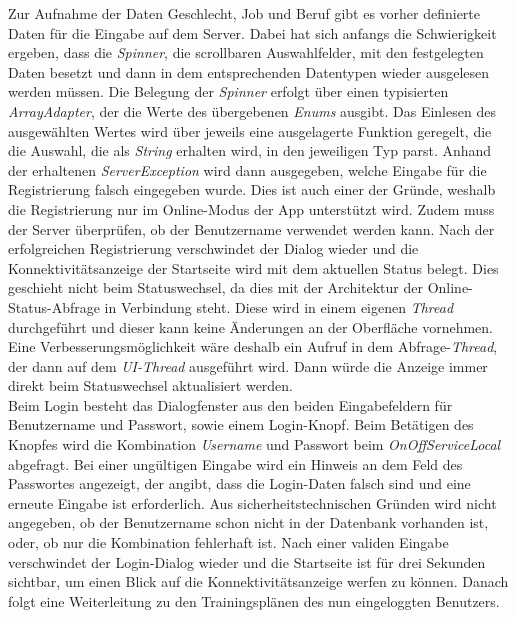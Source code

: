 Zur Aufnahme der Daten Geschlecht, Job und Beruf gibt es vorher definierte Daten für die Eingabe auf dem Server. Dabei hat sich anfangs die Schwierigkeit ergeben, dass die \textit{Spinner}, die scrollbaren Auswahlfelder, mit den festgelegten Daten besetzt und dann in dem entsprechenden Datentypen wieder ausgelesen werden müssen. Die Belegung der \textit{Spinner} erfolgt über einen typisierten \textit{ArrayAdapter}, der die Werte des übergebenen \textit{Enums} ausgibt. Das Einlesen des ausgewählten Wertes wird über jeweils eine ausgelagerte Funktion geregelt, die die Auswahl, die als \textit{String} erhalten wird, in den jeweiligen Typ parst. Anhand der erhaltenen \textit{ServerException} wird dann ausgegeben, welche Eingabe für die Registrierung falsch eingegeben wurde. Dies ist auch einer der Gründe, weshalb die Registrierung nur im Online-Modus der App unterstützt wird. Zudem muss der Server überprüfen, ob der Benutzername verwendet werden kann. Nach der erfolgreichen Registrierung verschwindet der Dialog wieder und die Konnektivitätsanzeige der Startseite wird mit dem aktuellen Status belegt. Dies geschieht nicht beim Statuswechsel, da dies mit der Architektur der Online-Status-Abfrage in Verbindung steht. Diese wird in einem eigenen \textit{Thread} durchgeführt und dieser kann keine Änderungen an der Oberfläche vornehmen. Eine Verbesserungsmöglichkeit wäre deshalb ein Aufruf in dem Abfrage-\textit{Thread}, der dann auf dem \textit{UI-Thread} ausgeführt wird. Dann würde die Anzeige immer direkt beim Statuswechsel aktualisiert werden.\\
Beim Login besteht das Dialogfenster aus den beiden Eingabefeldern für Benutzername und Passwort, sowie einem Login-Knopf. Beim Betätigen des Knopfes wird die Kombination \textit{Username} und Passwort beim \textit{OnOffServiceLocal} abgefragt. Bei einer ungültigen Eingabe wird ein Hinweis an dem Feld des Passwortes angezeigt, der angibt, dass die Login-Daten falsch sind und eine erneute Eingabe ist erforderlich. Aus sicherheitstechnischen Gründen wird nicht angegeben, ob der Benutzername schon nicht in der Datenbank vorhanden ist, oder, ob nur die Kombination fehlerhaft ist. Nach einer validen Eingabe verschwindet der Login-Dialog wieder und die Startseite ist für drei Sekunden sichtbar, um einen Blick auf die Konnektivitätsanzeige werfen zu können. Danach folgt eine Weiterleitung zu den Trainingsplänen des nun eingeloggten Benutzers.\\
